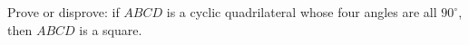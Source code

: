 Prove or disprove: if $ABCD$ is a cyclic quadrilateral whose four angles are all $90^\circ$, then $ABCD$ is a square.
